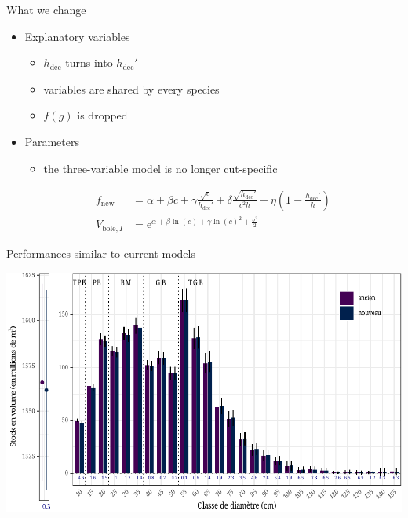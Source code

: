 \documentclass[sectiontocframe default=off, aspectratio=169]{beamer}
\newcommand{\fnew}{f_{\text{new}}}
\newcommand{\hdec}{h_{\text{dec}}}
\begin{document}
\begin{frame}{What we change}
	\begin{itemize}
		\item Explanatory variables
		\begin{itemize}
			\item \(\hdec\) turns into \(\hdec'\)
			\item variables are shared by every species
			\item \(f(g)\) is dropped
		\end{itemize}
		\item Parameters
		\begin{itemize}
			\item the three-variable model is no longer cut-specific 
		\end{itemize}
		\begin{align*}
			\fnew &= \alpha + \beta c + \gamma \frac{\sqrt{c}}{\hdec'} + \delta \frac{\sqrt{\hdec'}}{c^2 h} + \eta \left( 1 - \frac{\hdec'}{h} \right) \\
			V_{\text{bole}, I} &= \mathrm{e}^{\alpha + \beta \ln(c) + \gamma \ln(c)^2 + \frac{\sigma^2}{2}}
		\end{align*}
	\end{itemize}
\end{frame}

\begin{frame}{Performances similar to current models}
	\begin{center}
		\includegraphics[scale = 0.7]{./figures/estimate_vbole_bygirth.pdf}
	\end{center}
\end{frame}
\end{document}
